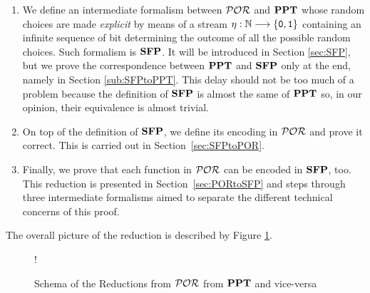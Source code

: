 \begin{enumerate}
 \item We define an intermediate formalism between $\mathcal{POR}$ and $\mathbf{PPT}$
 whose random choices are made \emph{explicit} by means of a stream $\eta: \mathbb{N} \longrightarrow \{\mathtt{0},\mathtt{1}\}$ containing an infinite sequence of bit determining the outcome of all the possible random choices. Such formalism is $\mathbf{SFP}$.
 It will be introduced in Section \ref{sec:SFP}, but we  prove the
 correspondence between $\mathbf{PPT}$ and $\mathbf{SFP}$ only at the end, namely
 in Section \ref{sub:SFPtoPPT}. This delay should not be too much of a problem
 because the definition of $\mathbf{SFP}$ is almost the same of $\mathbf{PPT}$ so,
 in our opinion, their equivalence is almost trivial.
 \item On top of the definition of $\mathbf{SFP}$, we define its encoding in $\mathcal{POR}$
 and prove it correct. This is carried out in Section~\ref{sec:SFPtoPOR}.
 \item Finally, we prove that each function in $\mathcal{POR}$ can be encoded in $\mathbf{SFP}$,
 too. This reduction is presented in Section~\ref{sec:PORtoSFP} and
 steps through three intermediate formalisms aimed to separate the different technical
 concerns of this proof.
\end{enumerate}

\noindent
The overall picture of the reduction is described by Figure \ref{fig:redschema}.

\begin{figure}
  \begin{resizebox}{\textwidth}{!}{%
    }%
  \end{resizebox}
  \caption{Schema of the Reductions from $\mathcal{POR}$ from $\mathbf{PPT}$ and vice-versa}
  \label{fig:redschema}

\end{figure}
